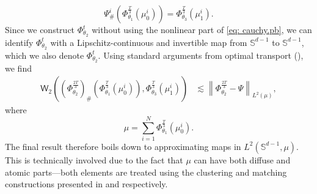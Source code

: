 \documentclass[a4paper,11pt]{article}
\theoremstyle{plain}
\renewcommand{\S}{\mathbb{S}^{d-1}}
\numberwithin{equation}{section}
\begin{document}
\begin{enumerate}
\begin{equation*}
    \Psi^i_\#\left(\Phi_{\theta_1}^{\frac{T}{3}}(\mu_0^i)\right) = \Phi^{\frac{T}{3}}_{\theta_3}(\mu_1^i).
\end{equation*} 
Since we construct $\Phi^t_{\theta_2}$ without using the nonlinear part of \eqref{eq: cauchy.pb}, we can identify $\Phi_{\theta_2}^t$ with a Lipschitz-continuous and invertible map from $\S$ to $\S$, which we also denote $\Phi^t_{\theta_2}$. Using standard arguments from optimal transport (), we find
\begin{align*}
    \mathsf{W}_2\left( \left(\Phi^{ \frac{2T}{3} }_{\theta_2} \right)_\# \left(\Phi^{\frac{T}{3}}_{\theta_1}(\mu_0^i)\right), \Phi_{\theta_3}^{\frac{T}{3}}(\mu_1^i)\right)&\lesssim \left\|\Phi_{\theta_2}^{\frac{2T}{3}}-\Psi\right\|_{L^2(\mu)},
\end{align*}
where $$\mu=\sum_{i=1}^N \Phi_{\theta_1}^{\frac{T}{3}}(\mu_0^i).$$ 
The final result therefore boils down to approximating maps in $L^2(\S,\mu)$. This is technically involved due to the fact that $\mu$ can have both diffuse and atomic parts---both elements are treated using the clustering and matching constructions presented in {\bf {}} and {\bf {}} respectively.
\end{enumerate}

\begin{figure}[omitted: a diagram of this paper's results, not reproduced here]\label{fig: overview.2}\end{figure}
\end{document}
